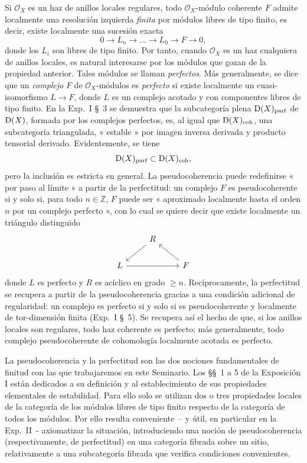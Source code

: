 Si \(\mathcal O_X\) es un haz de anillos locales regulares, todo \(\mathcal O_X\)-módulo coherente \(F\) admite localmente una resolución izquierda \emph{finita} por módulos libres de tipo finito, es decir, existe localmente una sucesión exacta
\[
  0\longrightarrow L_n\longrightarrow \ldots \longrightarrow L_0\longrightarrow F\longrightarrow 0,
\]
donde los \(L_i\) son libres de tipo finito. Por tanto, cuando \(\mathcal O_X\) es un haz cualquiera de anillos locales, es natural interesarse por los módulos que gozan de la propiedad anterior. Tales módulos se llaman \emph{perfectos}. Más generalmente, se dice que un \emph{complejo} \(F\) de \(\mathcal O_X\)-módulos es \emph{perfecto} si existe localmente un cuasi-isomorfismo \(L\to F\), donde \(L\) es un complejo acotado y con componentes libres de tipo finito. En la Exp.\ I \S~3 se demuestra que la subcategoría plena \(\mathrm D(X)_{\mathrm{parf}}\) de \(\mathrm D(X)\), formada por los complejos perfectos, es, al igual que \(\mathrm D(X)_{\mathrm{coh}}\), una subcategoría triangulada, « estable » por imagen inversa derivada y producto tensorial derivado. Evidentemente, se tiene
\[
  \mathrm D(X)_{\mathrm{parf}}\subset\mathrm D(X)_{\mathrm{coh}},
\]
pero la inclusión es estricta en general. La pseudocoherencia puede redefinirse « por paso al límite » a partir de la perfectitud: un complejo \(F\) es pseudocoherente si y solo si, para todo \(n\in\mathbb Z\), \(F\) puede ser « aproximado localmente hasta el orden \(n\) por un complejo perfecto », con lo cual se quiere decir que existe localmente un triángulo distinguido
\[
\begin{tikzcd}
& R \arrow[dl] &\\
L \arrow[rr] && F \arrow[ul]
\end{tikzcd}
\]
donde \(L\) es perfecto y \(R\) es acíclico en grado \(\geq n\). Recíprocamente, la perfectitud se recupera a partir de la pseudocoherencia gracias a una condición adicional de regularidad: un complejo es perfecto si y solo si es pseudocoherente y localmente de tor-dimensión finita (Exp.\ I \S~5). Se recupera así el hecho de que, si los anillos locales son regulares, todo haz coherente es perfecto; más generalmente, todo complejo pseudocoherente de cohomología localmente acotada es perfecto.

La pseudocoherencia y la perfectitud son las dos nociones fundamentales de finitud con las que trabajaremos en este Seminario. Los §§~1 a 5 de la Exposición I están dedicados a su definición y al establecimiento de sus propiedades elementales de estabilidad. Para ello solo se utilizan dos o tres propiedades locales de la categoría de los módulos libres de tipo finito respecto de la categoría de todos los módulos. Por ello resulta conveniente~-- y útil, en particular en la Exp.\ II~- axiomatizar la situación, introduciendo una noción de pseudocoherencia (respectivamente, de perfectitud) en una categoría fibrada sobre un sitio, relativamente a una subcategoría fibrada que verifica condiciones convenientes.

